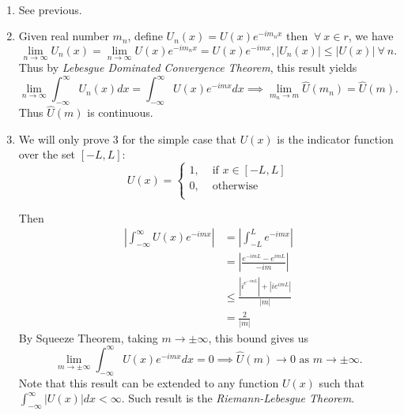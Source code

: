 \documentclass[class=article,crop=false]{standalone}
\begin{document}
\begin{prf}
~\begin{enumerate}[label=\arabic*)]
	\item See previous.
	\item Given real number  $ m_n$, define $ U_n(x) = U(x) e^{-im_n x}$ then $ \ \forall \ x \in r$, we have
		\[
			\lim_{ n \to \infty} U_n(x) = \lim_{ n \to \infty} U(x) e^{-im_n x} = U(x) e^{-imx}, |U_n(x)|\leq |U(x)| \ \forall \ n
		.\] 
		Thus by \emph{Lebesgue Dominated Convergence Theorem}, this result yields
		\[
		 \lim_{ n \to \infty} \int_{-\infty}^{\infty} U_n(x) dx = \int_{-\infty}^{\infty}  U(x) e^{-imx} dx \implies \lim_{ m_n \to m} \hat{ U}(m_n) = \hat{ U}(m) 
		.\] 
		Thus $ \hat{ U}(m)$ is continuous.
	\item We will only prove 3 for the simple case that $ U(x)$ is the indicator function over the set  $ [-L,L]$:
		 \begin{equation*}
			 U(x)=
		\begin{cases}
			1, &\text{ if } x \in [-L,L] \\
			0, & \text{ otherwise}\\ 
		\end{cases}
		\end{equation*}

		Then
		\begin{align*}
			\left| \int_{-\infty}^{\infty} U(x) e^{-imx}  \right| &= \left| \int_{-L}^{L} e^{-imx}  \right|  \\
			&= \left| \frac{e^{-imL} - e^{imL}}{ -im} \right|  \\
			&\leq \frac{|i^{e^{-imL}}| + |i e^{imL}|}{|m|}  \\
			&= \frac{2}{|m|} 
		\end{align*}
		By Squeeze Theorem, taking $ m \to \pm \infty$, this bound gives us
		\[
			\lim_{ m \to \pm \infty} \int_{-\infty}^{\infty} U(x) e^{-imx} dx = 0 \implies \hat{ U}(m) \to 0 \text{ as } m  \to \pm \infty  
		.\] 
		Note that this result can be extended to any function $ U(x)$ such that  $ \int_{-\infty}^{\infty} |U(x)|dx < \infty$. Such result is the \emph{Riemann-Lebesgue Theorem}.  
\end{enumerate}
\end{prf}
\end{document}
